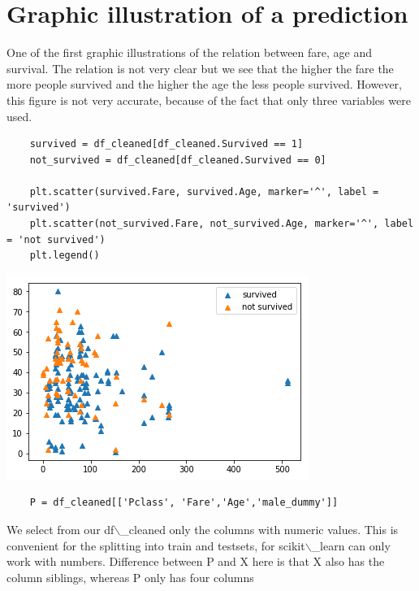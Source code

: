 \documentclass[11pt]{article}
\begin{document}
\section{Graphic illustration of a prediction}
\label{graphic-illustration-of-a-prediction}
One of the first graphic illustrations of the relation between fare, age
and survival. The relation is not very clear but we see that the higher
the fare the more people survived and the higher the age the less people
survived. However, this figure is not very accurate, because of the fact
that only three variables were used.

\begin{verbatim}
    survived = df_cleaned[df_cleaned.Survived == 1]
    not_survived = df_cleaned[df_cleaned.Survived == 0]

    plt.scatter(survived.Fare, survived.Age, marker='^', label = 'survived')
    plt.scatter(not_survived.Fare, not_survived.Age, marker='^', label = 'not survived')
    plt.legend()
\end{verbatim}

\begin{center}
\includegraphics[width=.9\linewidth]{output_28_1.png}
\end{center}

\begin{verbatim}
    P = df_cleaned[['Pclass', 'Fare','Age','male_dummy']]
\end{verbatim}

We select from our df$\backslash$\_cleaned only the columns with numeric values.
This is convenient for the splitting into train and testsets, for
scikit$\backslash$\_learn can only work with numbers. Difference between P and X
here is that X also has the column siblings, whereas P only has four
columns
\end{document}

